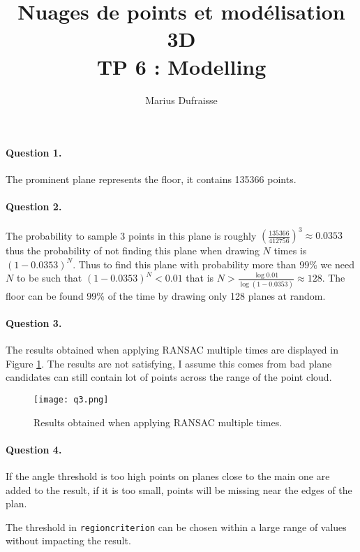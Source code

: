 \documentclass[french]{article}
\begin{document}
	\title{Nuages de points et modélisation 3D\\
		TP 6 : Modelling
	}
	\author{Marius Dufraisse}
	\date{}
	
	\maketitle
	
	\paragraph{Question 1.}
	The prominent plane represents the floor, it contains 135366 points.
	
	\paragraph{Question 2.}
	The probability to sample 3 points in this plane is roughly $\left(\frac{135366}{412756}\right)^3\approx0.0353$ thus the probability of not finding this plane when drawing $N$ times is $(1-0.0353)^N$. Thus to find this plane with probability more than 99\% we need $N$ to be such that $(1-0.0353)^N < 0.01$ that is $N > \frac{\log 0.01}{\log(1-0.0353)}\approx 128 $. The floor can be found 99\% of the time by drawing only 128 planes at random.
	
	\paragraph{Question 3.}
	The results obtained when applying RANSAC multiple times are displayed in Figure \ref{fig:q3}. The results are not satisfying, I assume this comes from bad plane candidates can still contain lot of points across the range of the point cloud.
	
	\begin{figure}[h!]
		\centering
		\texttt{[image: q3.png]}
		\caption{Results obtained when applying RANSAC multiple times.}
		\label{fig:q3}
	\end{figure}
	
	\paragraph{Question 4.}
	If the angle threshold is too high points on planes close to the main one are added to the result, if it is too small, points will be missing near the edges of the plan.
	
	The threshold in \texttt{region\textunderscore{}criterion} can be chosen within a large range of values without impacting the result.
	
\end{document}
